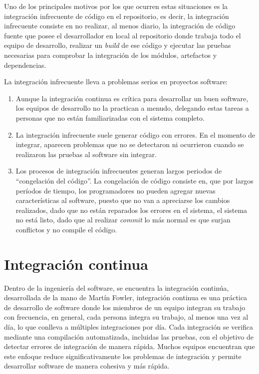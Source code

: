 \clearpage

Uno de los principales motivos por los que ocurren estas situaciones es la integración infrecuente de código en el repositorio, es decir, la integración infrecuente consiste en no realizar, al menos diario, la integración de código fuente que posee el desarrollador en local al repositorio donde trabaja todo el equipo de desarrollo, realizar un \textit{build} de ese código y ejecutar las pruebas necesarias para comprobar la integración de los módulos, artefactos y dependencias.

La integración infrecuente lleva a problemas serios en proyectos software\cite{LeonardoDeSeta}:
\begin{enumerate}
\item Aunque la integración continua es crítica para desarrollar un buen software, los equipos de desarrollo no la practican a menudo, delegando estas tareas a personas que no están familiarizadas con el sistema completo.
\item La integración infrecuente suele generar código con errores. En el momento de integrar, aparecen problemas que no se detectaron ni ocurrieron cuando se realizaron las pruebas al software sin integrar.
\item Los procesos de integración infrecuentes generan largos periodos de ``congelación del código''. La congelación de código consiste en, que por largos períodos de tiempo, los programadores no pueden agregar nuevas características al software, puesto que no van a apreciarse los cambios realizados, dado que no están reparados los errores en el sistema, el sistema no está listo, dado que al realizar \textit{commit} lo más normal es que surjan conflictos y no compile el código.
\end{enumerate}

\section{Integración continua}

Dentro de la ingeniería del software, se encuentra la integración continúa, desarrollada de la mano de Martín Fowler\cite{IC}, integración continua es una práctica de desarrollo de software donde los miembros de un equipo integran su trabajo con frecuencia, en general, cada persona integra su trabajo, al menos una vez al día, lo que conlleva a múltiples integraciones por día. Cada integración se verifica mediante una compilación automatizada, incluidas las pruebas, con el objetivo de detectar errores de integración de manera rápida. Muchos equipos encuentran que este enfoque reduce significativamente los problemas de integración y permite desarrollar software de manera cohesiva y más rápida.

